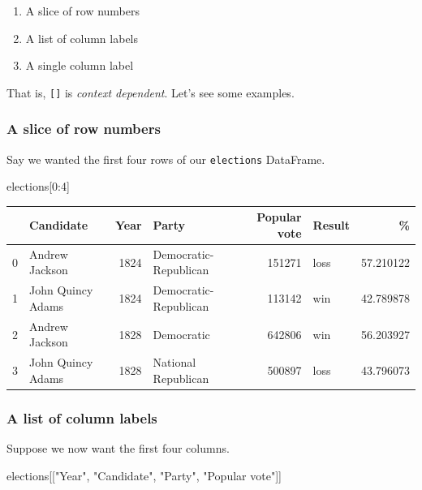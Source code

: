 \documentclass[
  letterpaper,
  DIV=11,
  numbers=noendperiod]{scrreprt}
\newenvironment{Shaded}{\begin{snugshade}}{\end{snugshade}}
\newcommand{\DecValTok}[1]{\textcolor[rgb]{0.68,0.00,0.00}{#1}}
\newcommand{\NormalTok}[1]{\textcolor[rgb]{0.00,0.23,0.31}{#1}}
\newcommand{\StringTok}[1]{\textcolor[rgb]{0.13,0.47,0.30}{#1}}
\providecommand{\tightlist}{%
  \setlength{\itemsep}{0pt}\setlength{\parskip}{0pt}}\usepackage{longtable,booktabs,array}
\begin{document}
\begin{enumerate}
\def\labelenumi{\arabic{enumi}.}
\tightlist
\item
  A slice of row numbers
\item
  A list of column labels
\item
  A single column label
\end{enumerate}

That is, \texttt{{[}{]}} is \emph{context dependent}. Let's see some
examples.

\hypertarget{a-slice-of-row-numbers}{%
\subsubsection{A slice of row numbers}\label{a-slice-of-row-numbers}}

Say we wanted the first four rows of our \texttt{elections} DataFrame.

\begin{Shaded}
\begin{Highlighting}[]
\NormalTok{elections[}\DecValTok{0}\NormalTok{:}\DecValTok{4}\NormalTok{]}
\end{Highlighting}
\end{Shaded}

\begin{tabular}{llrlrlr}
\toprule
{} &          Candidate &  Year &                  Party &  Popular vote & Result &          \% \\
\midrule
0 &     Andrew Jackson &  1824 &  Democratic-Republican &        151271 &   loss &  57.210122 \\
1 &  John Quincy Adams &  1824 &  Democratic-Republican &        113142 &    win &  42.789878 \\
2 &     Andrew Jackson &  1828 &             Democratic &        642806 &    win &  56.203927 \\
3 &  John Quincy Adams &  1828 &    National Republican &        500897 &   loss &  43.796073 \\
\bottomrule
\end{tabular}

\hypertarget{a-list-of-column-labels}{%
\subsubsection{A list of column labels}\label{a-list-of-column-labels}}

Suppose we now want the first four columns.

\begin{Shaded}
\begin{Highlighting}[]
\NormalTok{elections[[}\StringTok{"Year"}\NormalTok{, }\StringTok{"Candidate"}\NormalTok{, }\StringTok{"Party"}\NormalTok{, }\StringTok{"Popular vote"}\NormalTok{]]}
\end{Highlighting}
\end{Shaded}
\end{document}
